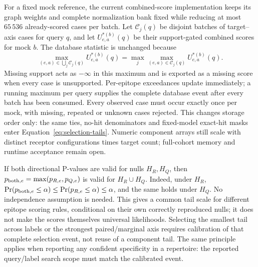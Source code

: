 \documentclass[10pt,a4paper]{article}
\theoremstyle{definition}
\begin{document}
For a fixed mock reference, the current combined-score implementation keeps its graph weights and complete normalization bank fixed while reducing at most $65\,536$ already-scored cases per batch.
Let $\mathcal C_j(q)$ be disjoint batches of target--axis cases for query $q$, and let $U_{e,a}^{*(b)}(q)$ be their support-gated combined scores for mock $b$.
The database statistic is unchanged because
\[
 \max_{(e,a)\in\bigcup_j\mathcal C_j(q)}U_{e,a}^{*(b)}(q)
 =\max_j\max_{(e,a)\in\mathcal C_j(q)}U_{e,a}^{*(b)}(q).
\]
Missing support acts as $-\infty$ in this maximum and is exported as a missing score when every case is unsupported.
Per-epitope exceedances update immediately; a running maximum per query supplies the complete database event after every batch has been consumed.
Every observed case must occur exactly once per mock, with missing, repeated or unknown cases rejected.
This changes storage order only: the same ties, no-hit denominators and fixed-model exact-hit masks enter Equation~\eqref{eq:selection-tails}.
Numeric component arrays still scale with distinct receptor configurations times target count; full-cohort memory and runtime acceptance remain open.

If both directional P-values are valid for nulls $H_R,H_Q$, then
$p_{{\rm both},e}=\max(p_{R,e},p_{Q,e})$ is valid for $H_R\cup H_Q$.
Indeed, under $H_R$, $\Pr(p_{{\rm both},e}\le\alpha)\le\Pr(p_{R,e}\le\alpha)\le\alpha$, and the same holds under $H_Q$.
No independence assumption is needed.
This gives a common tail scale for different epitope scoring rules, conditional on their own correctly reproduced nulls; it does not make the scores themselves universal likelihoods.
Selecting the smallest tail across labels or the strongest paired/marginal axis requires calibration of that complete selection event, not reuse of a component tail.
The same principle applies when reporting any confident specificity in a repertoire: the reported query/label search scope must match the calibrated event.
\end{document}
